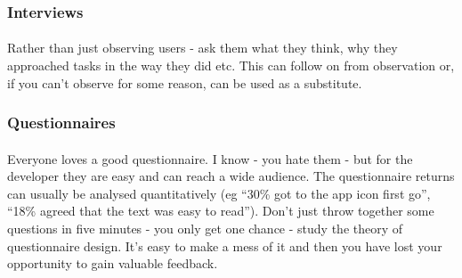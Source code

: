 \subsubsection{Interviews}

\paragraph{} Rather than just observing users - ask them what they think, why they approached tasks in the way they did etc. This can follow on from observation or, if you can’t observe for some reason, can be used as a substitute.

\subsubsection{Questionnaires}
\paragraph{} Everyone loves a good questionnaire. I know - you hate them - but for the developer they are easy and can reach a wide audience. The questionnaire returns can usually be analysed quantitatively (eg ``30\% got to the app icon first go'', ``18\% agreed that the text was easy to read''). Don’t just throw together some questions in five minutes - you only get one chance - study the theory of questionnaire design. It’s easy to make a mess of it and then you have lost your opportunity to gain valuable feedback.

